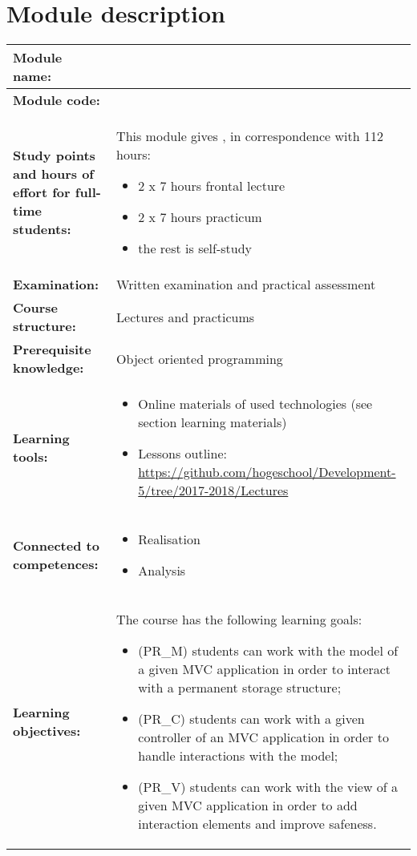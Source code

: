 \section*{Module description}
\begin{tabularx}{\textwidth}{|>{\columncolor{lichtGrijs}} p{}|X|}
	\hline
	\textbf{Module name:} & \modulenaam\\
	\hline
	\textbf{Module code: }& \modulecode\\
	\hline
	\textbf{Study points \newline and hours of effort for full-time students:} & This module gives \stdPunten, in correspondence with 112 hours:
	\begin{itemize}
		\item 2 x 7 hours frontal lecture
		\item 2 x 7 hours practicum 
		\item the rest is self-study
	\end{itemize} \\
	\hline
	\textbf{Examination:} & Written examination and practical assessment \\
	\hline
	\textbf{Course structure:} & Lectures and practicums\\
	\hline
	\textbf{Prerequisite knowledge:} & Object oriented programming \\
	\hline
	\textbf{Learning tools:} & \begin{itemize}
			\item  Online materials of used technologies (see section learning materials) 
			\item  Lessons outline: \url{https://github.com/hogeschool/Development-5/tree/2017-2018/Lectures}
		\end{itemize} \\
	\hline
	\textbf{Connected to \newline competences:} & \begin{itemize}
			\item Realisation
			\item Analysis
		\end{itemize} \\
	\hline
	\textbf{Learning objectives:} &
		The course has the following learning goals: 
			\begin{itemize}
					\item (PR\_M) students can work with the model of a given MVC application in order to interact with a permanent storage structure; 
					\item  (PR\_C) students can work with a given controller of an MVC application in order to handle interactions with
the model; 
					\item (PR\_V) students can work with the view of a given MVC application in order to add interaction elements and improve safeness.
\end{itemize}


\end{tabularx}

